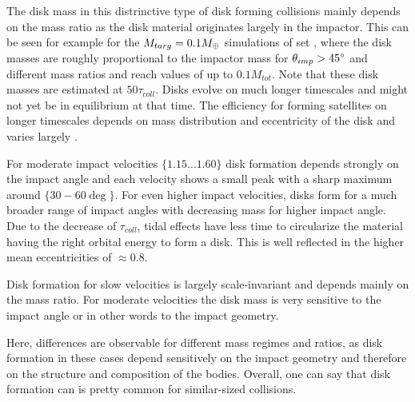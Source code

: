 The disk mass in this distrinctive type of disk forming collisions mainly depends on the mass ratio as the disk material originates largely in the impactor. This can be seen for example for the $M_{targ} = 0.1 M_{\oplus}$ simulations of set \css, where the disk masses are roughly proportional to the impactor mass for $\theta_{imp} > 45 ^\circ$ and different mass ratios and reach values of up to $0.1 M_{tot}$. Note that these disk masses are estimated at $50 \tau_{coll}$. Disks evolve on much longer timescales and might not yet be in equilibrium at that time. The efficiency for forming satellites on longer timescales depends on mass distribution and eccentricity of the disk and varies largely \cite{Kokubo:2000p2195}.

For moderate impact velocities $\{ 1.15 \dots 1.60\}$ disk formation depends strongly on the impact angle and each velocity shows a small peak with a sharp maximum around $\{30-60 \deg \}$. For even higher impact velocities, disks form for a much broader range of impact angles with decreasing mass for higher impact angle. Due to the decrease of $\tau_{coll}$, tidal effects have less time to circularize the material having the right orbital energy to form a disk. This is well reflected in the higher mean eccentricities of $\approx 0.8$. 

Disk formation for slow velocities is largely scale-invariant and depends mainly on the mass ratio. For moderate velocities the disk mass is very sensitive to the impact angle or in other words to the impact geometry. 

Here, differences are observable for different mass regimes and ratios, as disk formation in these cases depend sensitively on the impact geometry and therefore on the structure and composition of the bodies. Overall, one can say that disk formation can is pretty common for similar-sized collisions. 

